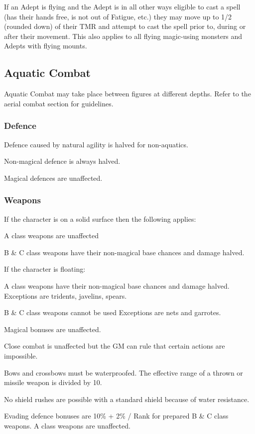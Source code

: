 \begin{multicols*}{3}
If an Adept is flying and the Adept is in all other ways eligible to
cast a spell (has their hands free, is not out of Fatigue, etc.) they
may move up to 1/2 (rounded down) of their TMR and attempt to cast the
spell prior to, during or after their movement. This also applies to
all flying magic-using monsters and Adepts with flying mounts.

\subsection{Aquatic Combat}
Aquatic Combat may take place between figures at different depths. Refer to
the aerial combat section for guidelines. 

\subsubsection{Defence}
\begin{Itemize}
\item Defence caused by natural agility is halved for non-aquatics.
\item Non-magical defence is always halved.
\item Magical defences are unaffected.
\end{Itemize}

\subsubsection{Weapons}
If the character is on a solid surface then the following applies:
\begin{Itemize}
\item A class weapons are unaffected
\item B \& C class weapons have their non-magical base chances and damage halved.
\end{Itemize}

If the character is floating:
\begin{Itemize}
\item A class weapons have their non-magical base chances and damage halved.
Exceptions are tridents, javelins, spears.
\item B \& C class weapons cannot be used  Exceptions are nets and garrotes.
\end{Itemize}

Magical bonuses are unaffected.

Close combat is unaffected but the GM can rule that certain actions
are impossible.

Bows and crossbows must be waterproofed. The effective range of a thrown or
missile weapon is divided by 10.

No shield rushes are possible with a standard shield because of water
resistance.

Evading defence bonuses are 10\% + 2\% / Rank for prepared B \& C
class weapons. A class weapons are unaffected.

\end{multicols*}

